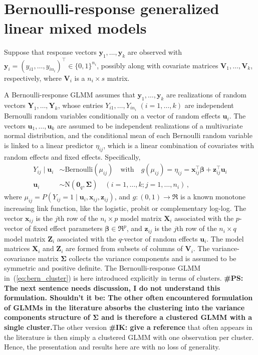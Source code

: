 \documentclass[11pt, a4paper]{article}
\newcommand*{\bb}{\boldsymbol}
\newcommand{\IK}[1]{{\noindent \color{blue} \bf \#IK: #1}}
\newcommand{\PS}[1]{{\noindent \color{red} \bf \#PS: #1}}
\theoremstyle{example} \newtheorem{example}{Example}[section]
\theoremstyle{theorem} \newtheorem{theorem}{Theorem}[section]
\def\bbeta{\bb{\beta}}
\def\bSigma{\bb{\Sigma}}
\def\by{\bb{y}}
\def\bY{\bb{Y}}
\def\bu{\bb{u}}
\def\bx{\bb{x}}
\def\bz{\bb{z}}
\def\b0{\bb{0}}
\def\bX{\bb{X}}
\def\bZ{\bb{Z}}
\def\bV{\bb{V}}
\def\bY{\bb{Y}}
\def\by{\bb{y}}
\begin{document}
\section{Bernoulli-response generalized linear mixed models}
\label{sec:bern_GLMMs}

Suppose that response vectors $\by_1, \ldots, \by_k$ are observed with
$\by_i = (y_{i1}, \ldots, y_{in_i})^\top \in \{0, 1\}^{n_i}$, possibly
along with covariate matrices $\bV_1, \ldots, \bV_k$, respectively,
where $\bV_i$ is a $n_i \times s$ matrix.

A Bernoulli-response GLMM assumes that $\by_1, \ldots, \by_k$
are realizations of random vectors $\bY_1, \ldots, \bY_k$, whose entries
$Y_{i1}, \ldots, Y_{in_i}$ $(i = 1, \ldots, k)$ are independent
Bernoulli random variables conditionally on a vector of random effects
$\bu_i$. The vectors $\bu_1, \ldots, \bu_k$ are assumed to be
independent realizations of a multivariate normal distribution, and the conditional mean of each Bernoulli random
variable is linked to a linear predictor $\eta_{ij}$, which is a
linear combination of covariates with random effects and fixed effects.
Specifically,
\begin{align}
\label{eq:bern_cluster}
  Y_{ij} \mid \bb{u}_i & \sim \text{Bernoulli}(\mu_{ij}) \quad \text{with} \quad
  g(\mu_{ij}) = \eta_{ij} = \bx_{ij}^\top \bbeta + \bz_{ij}^\top \bu_i\\
  \bu_i & \sim \text{N}(\b0_q, \bb{\Sigma})  \quad (i = 1, \ldots, k; j = 1, \ldots, n_i)\,,
\end{align}
where $\mu_{ij} = P(Y_{ij} = 1 \mid \bu_i, \bx_{ij}, \bz_{ij})$, and
$g: (0, 1) \to \Re$ is a known monotone increasing link function, like
the logistic, probit or complementary log-log. The vector $\bx_{ij}$
is the $j$th row of the $n_i \times p$ model matrix $\bX_{i}$
associated with the $p$-vector of fixed effect parameters
$\bbeta \in \Re^p$, and $\bz_{ij}$ is the $j$th row of the
$n_i \times q$ model matrix $\bZ_{i}$ associated with the $q$-vector
of random effects $\bu_i$. The model matrices $\bX_i$ and $\bZ_i$ are
formed from subsets of columns of $\bV_i$. The variance-covariance
matrix $\bSigma$ collects the variance components and is assumed to be
symmetric and positive definite. The Bernoulli-response GLMM
in~(\ref{eq:bern_cluster}) is here introduced explicitly in terms of
clusters. \PS{The next sentence needs discussion, I do not understand this formulation. Shouldn't it be: The other often encountered formulation of GLMMs in the literature \citep[Chapter 7.4]{mcculloch+etal:2008} absorbs the clustering into the variance components structure of $\bSigma$ and is therefore a clustered GLMM with a single cluster.}The other version \IK{give a reference} that often appears
in the literature is then simply a clustered GLMM with one observation
per cluster. Hence, the presentation and results here are with no loss
of generality.
\end{document}
